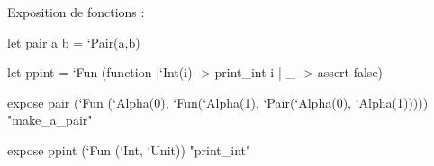 \documentclass[french,xcolor={usenames,dvipsnames}]{beamer}
\begin{document}
\begin{frame}
  Exposition de fonctions : \\

  \vspace{15pt}

  let pair a b = `Pair(a,b) \\

  \vspace{10pt}

  let ppint = `Fun (function |`Int(i) -> print\_int i | \_ -> assert false) \\

  \vspace{10pt}

  expose pair (`Fun (`Alpha(0), `Fun(`Alpha(1), `Pair(`Alpha(0), `Alpha(1))))) "make\_a\_pair" \\

  \vspace{10pt}

  expose ppint (`Fun (`Int, `Unit)) "print\_int"
\end{frame}
\end{document}
